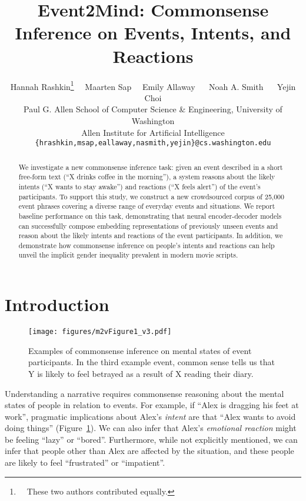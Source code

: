 \documentclass[11pt,a4paper]{article}
\title{Event2Mind: Commonsense Inference on Events, Intents, and Reactions 
}
\author{Hannah Rashkin\thanks{~~These two authors contributed equally.}~~ Maarten Sap\footnotemark[1] ~~ Emily Allaway ~~ Noah A. Smith ~~ Yejin Choi \\
  Paul G. Allen School of Computer Science \& Engineering, University of Washington \\
  Allen Institute for Artificial Intelligence\\
  {\tt \{hrashkin,msap,eallaway,nasmith,yejin\}@cs.washington.edu} }
\begin{document}
\maketitle


\begin{abstract}
We investigate a new commonsense inference task: given an event described in a short free-form text ({``X drinks coffee in the morning''}), a system reasons about the likely intents ({``X wants to stay awake''}) and reactions ({``X feels alert''}) of the event's participants. 
To support this study, we construct 
a new crowdsourced corpus of 25,000 event phrases covering a diverse range of everyday events and situations. We report baseline performance on this task, demonstrating that neural encoder-decoder models can successfully compose embedding representations of previously unseen events and reason about the likely intents and reactions of the event participants. 
In addition, we demonstrate how commonsense inference on people's intents and reactions can help unveil the implicit gender inequality prevalent in modern movie scripts.

\end{abstract}


\section{Introduction}




\begin{figure}
    \centering
    \texttt{[image: figures/m2vFigure1\_v3.pdf]}
    \caption{Examples of commonsense inference on mental states of event participants.
    In the third example event, common sense tells us that Y is likely to feel betrayed as a result of X reading their diary.
}
    \label{fig:commonsenseInferenceExamples}
\end{figure} 

Understanding a narrative  requires commonsense reasoning 
about the  mental states of people in relation to events. 
For example, if ``Alex is dragging his feet at work'', pragmatic implications about Alex's \emph{intent} are that ``Alex wants to avoid doing things'' (Figure~\ref{fig:commonsenseInferenceExamples}). We can also infer that Alex's \emph{emotional reaction} might be feeling ``lazy'' or ``bored''. Furthermore, while not explicitly mentioned, we can infer that people other than Alex are affected by the situation, and these people are likely to feel ``frustrated'' or ``impatient''. 
\end{document}
